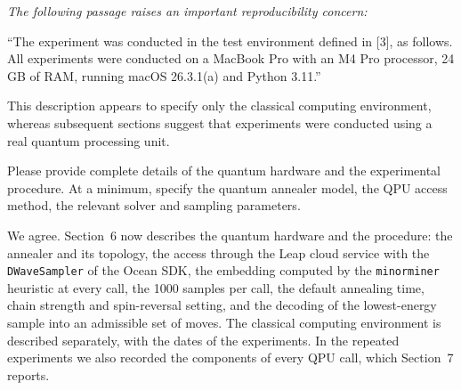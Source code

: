 \documentclass[12pt]{article}
\newenvironment{rc}[1]{\par\medskip\noindent\itshape\renewcommand{\emph}[1]{\textbf{##1}}\ignorespaces}{\par}
\newcommand{\answer}[1]{\par\smallskip\noindent #1\par}
\begin{document}
\begin{rc}{R2 4 --- Quantum hardware and procedure}
The following passage raises an important reproducibility concern:

``The experiment was conducted in the test environment defined in [3], as follows. All experiments were conducted on a MacBook Pro with an M4 Pro processor, 24 GB of RAM, running macOS 26.3.1(a) and Python 3.11.''

This description appears to specify only the classical computing environment, whereas subsequent sections suggest that experiments were conducted using a real quantum processing unit.

Please provide complete details of the quantum hardware and the experimental procedure. At a minimum, specify the quantum annealer model, the QPU access method, the relevant solver and sampling parameters.
\end{rc}
\answer{We agree. Section~6 now describes the quantum hardware and the procedure: the annealer and its topology, the access through the Leap cloud service with the \texttt{DWaveSampler} of the Ocean SDK, the embedding computed by the \texttt{minorminer} heuristic at every call, the 1000 samples per call, the default annealing time, chain strength and spin-reversal setting, and the decoding of the lowest-energy sample into an admissible set of moves. The classical computing environment is described separately, with the dates of the experiments. In the repeated experiments we also recorded the components of every QPU call, which Section~7 reports.}
\end{document}
